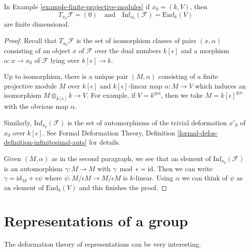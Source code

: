 \begin{lemma}
\label{lemma-finite-projective-modules-TI}
In Example \ref{example-finite-projective-modules} if $x_0 = (k, V)$, then
$$
T_{x_0}\mathcal{F} = (0)
\quad\text{and}\quad
\text{Inf}_{x_0}(\mathcal{F}) = \text{End}_k(V)
$$
are finite dimensional.
\end{lemma}

\begin{proof}
Recall that $T_{x_0}\mathcal{F}$ is the set of isomorphism
classes of pairs $(x, \alpha)$ consisting of an object $x$ of $\mathcal{F}
$ over the dual numbers $k[\epsilon]$ and a morphism
$\alpha : x \to x_0$ of $\mathcal{F}$ lying over $k[\epsilon] \to k$.

\medskip\noindent
Up to isomorphism, there is a unique pair $(M, \alpha)$ consisting of a
finite projective module $M$ over $k[\epsilon]$
and $k[\epsilon]$-linear map $\alpha : M \to V$
which induces an isomorphism $M \otimes_{k[\epsilon]} k \to V$.
For example, if $V = k^{\oplus n}$, then we take
$M = k[\epsilon]^{\oplus n}$ with the obvious map $\alpha$.

\medskip\noindent
Similarly, $\text{Inf}_{x_0}(\mathcal{F})$ is the set of automorphisms
of the trivial deformation $x'_0$ of $x_0$ over $k[\epsilon]$.
See Formal Deformation Theory, Definition
\ref{formal-defos-definition-infinitesimal-auts} for details.

\medskip\noindent
Given $(M, \alpha)$ as in the second paragraph, we see that an element of
$\text{Inf}_{x_0}(\mathcal{F})$ is an automorphism $\gamma : M \to M$ with
$\gamma \bmod \epsilon = \text{id}$. Then we can write
$\gamma = \text{id}_M + \epsilon \psi$ where
$\psi : M/\epsilon M \to M/\epsilon M$ is $k$-linear.
Using $\alpha$ we can think of $\psi$ as an element of
$\text{End}_k(V)$ and this finishes the proof.
\end{proof}




\section{Representations of a group}
\label{section-representations}

\noindent
The deformation theory of representations can be very interesting.

